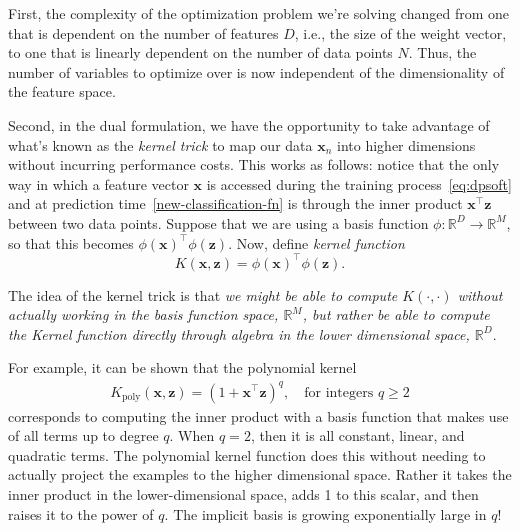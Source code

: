 First, the complexity of the optimization problem we're solving changed from one that is dependent on the number of features $D$, i.e., the size of the weight vector, to one that is linearly dependent on the number of data points $N$. Thus, the number of variables to optimize over is now independent of the dimensionality of the feature space.

Second, in the dual formulation, we have the opportunity to take advantage of what's known as the \textit{kernel trick} to map our data $\textbf{x}_{n}$ into higher dimensions without incurring performance costs. This works as follows: notice that the only way in which a feature vector ${\mathbf x}$ is accessed during the training process~\eqref{eq:dpsoft} and at prediction time~\eqref{new-classification-fn} is through the inner product $\textbf{x}^\top\textbf{z}$ between two data points. Suppose that we are using a basis function $\phi: \mathbb{R}^D\to\mathbb{R}^M$, so that this becomes $\phi(\textbf{x})^\top \phi(\textbf{z})$. Now, define {\em kernel function}
%
\begin{equation} \label{kernel-fn}
	K(\textbf{x}, \textbf{z}) = \phi(\textbf{x})^\top \phi(\textbf{z}).
      \end{equation}

      The idea of the kernel trick is that {\em we might be able to compute $K(\cdot,\cdot)$ without actually working in the basis function space, $\mathbb{R}^M$, but rather be able to compute the Kernel function directly through algebra in the lower dimensional space, $\mathbb{R}^D$}.

        For example, it can be shown that the polynomial kernel
        \begin{align}
          K_{\mathrm{poly}}(\mathbf{x},\mathbf{z})=(1+\mathbf{x}^\top \mathbf{z})^q, \quad \mbox{for integers $q\geq 2$}
        \end{align}
        corresponds to computing the inner product with a basis function that makes use of all terms up to degree $q$. When $q=2$, then it is all constant, linear, and quadratic terms. The polynomial kernel function does this without needing to actually project the examples to the higher dimensional space. Rather it takes the inner product in the lower-dimensional space, adds 1 to this scalar, and then raises it to the power of $q$. The implicit basis is growing exponentially large in $q$! 
        
   

